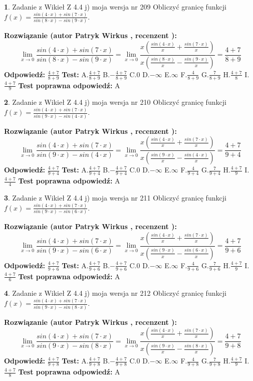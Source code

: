 \documentclass[12pt, a4paper]{article}
\theoremstyle{definition} %
\newtheorem{zad}{}
\newcommand{\zadStart}[1]{\begin{zad}#1\newline}
\newcommand{\zadStop}{\end{zad}}
\newcommand{\rozwStart}[2]{\noindent \textbf{Rozwiązanie (autor #1 , recenzent #2): }\newline}
\newcommand{\rozwStop}{\newline}
\newcommand{\odpStart}{\noindent \textbf{Odpowiedź:}\newline}
\newcommand{\odpStop}{\newline}
\newcommand{\testStart}{\noindent \textbf{Test:}\newline}
\newcommand{\testStop}{\newline}
\newcommand{\kluczStart}{\noindent \textbf{Test poprawna odpowiedź:}\newline}
\newcommand{\kluczStop}{\newline}
\begin{document}
\zadStart{Zadanie z Wikieł Z 4.4 j) moja wersja nr 209}
Obliczyć granicę funkcji $f(x)=\frac{sin(4\cdot x) +sin(7\cdot x)}{sin(8\cdot x) -sin(9\cdot x)}$.
\zadStop
\rozwStart{Patryk Wirkus}{}
$$\lim\limits_{x\to 0}\frac{sin(4\cdot x) +sin(7\cdot x)}{sin(8\cdot x) -sin(9\cdot x)}=\lim\limits_{x\to 0}\frac{x(\frac{sin(4\cdot x)}{x}+\frac{sin(7\cdot x)}{x})}{x(\frac{sin(8\cdot x)}{x}-\frac{sin(9\cdot x)}{x})}=\frac{4+7}{8+9}$$
\rozwStop
\odpStart
$\frac{4+7}{8+9}$
\odpStop
\testStart
A.$\frac{4+7}{8+9}$
B.$-\frac{4+7}{8+9}$
C.$0$
D.$-\infty$
E.$\infty$
F.$\frac{4}{8+9}$
G.$\frac{7}{8+9}$
H.$\frac{4+7}{8}$
I.$\frac{4+7}{9}$
\testStop
\kluczStart
A
\kluczStop



\zadStart{Zadanie z Wikieł Z 4.4 j) moja wersja nr 210}
Obliczyć granicę funkcji $f(x)=\frac{sin(4\cdot x) +sin(7\cdot x)}{sin(9\cdot x) -sin(4\cdot x)}$.
\zadStop
\rozwStart{Patryk Wirkus}{}
$$\lim\limits_{x\to 0}\frac{sin(4\cdot x) +sin(7\cdot x)}{sin(9\cdot x) -sin(4\cdot x)}=\lim\limits_{x\to 0}\frac{x(\frac{sin(4\cdot x)}{x}+\frac{sin(7\cdot x)}{x})}{x(\frac{sin(9\cdot x)}{x}-\frac{sin(4\cdot x)}{x})}=\frac{4+7}{9+4}$$
\rozwStop
\odpStart
$\frac{4+7}{9+4}$
\odpStop
\testStart
A.$\frac{4+7}{9+4}$
B.$-\frac{4+7}{9+4}$
C.$0$
D.$-\infty$
E.$\infty$
F.$\frac{4}{9+4}$
G.$\frac{7}{9+4}$
H.$\frac{4+7}{9}$
I.$\frac{4+7}{4}$
\testStop
\kluczStart
A
\kluczStop



\zadStart{Zadanie z Wikieł Z 4.4 j) moja wersja nr 211}
Obliczyć granicę funkcji $f(x)=\frac{sin(4\cdot x) +sin(7\cdot x)}{sin(9\cdot x) -sin(6\cdot x)}$.
\zadStop
\rozwStart{Patryk Wirkus}{}
$$\lim\limits_{x\to 0}\frac{sin(4\cdot x) +sin(7\cdot x)}{sin(9\cdot x) -sin(6\cdot x)}=\lim\limits_{x\to 0}\frac{x(\frac{sin(4\cdot x)}{x}+\frac{sin(7\cdot x)}{x})}{x(\frac{sin(9\cdot x)}{x}-\frac{sin(6\cdot x)}{x})}=\frac{4+7}{9+6}$$
\rozwStop
\odpStart
$\frac{4+7}{9+6}$
\odpStop
\testStart
A.$\frac{4+7}{9+6}$
B.$-\frac{4+7}{9+6}$
C.$0$
D.$-\infty$
E.$\infty$
F.$\frac{4}{9+6}$
G.$\frac{7}{9+6}$
H.$\frac{4+7}{9}$
I.$\frac{4+7}{6}$
\testStop
\kluczStart
A
\kluczStop



\zadStart{Zadanie z Wikieł Z 4.4 j) moja wersja nr 212}
Obliczyć granicę funkcji $f(x)=\frac{sin(4\cdot x) +sin(7\cdot x)}{sin(9\cdot x) -sin(8\cdot x)}$.
\zadStop
\rozwStart{Patryk Wirkus}{}
$$\lim\limits_{x\to 0}\frac{sin(4\cdot x) +sin(7\cdot x)}{sin(9\cdot x) -sin(8\cdot x)}=\lim\limits_{x\to 0}\frac{x(\frac{sin(4\cdot x)}{x}+\frac{sin(7\cdot x)}{x})}{x(\frac{sin(9\cdot x)}{x}-\frac{sin(8\cdot x)}{x})}=\frac{4+7}{9+8}$$
\rozwStop
\odpStart
$\frac{4+7}{9+8}$
\odpStop
\testStart
A.$\frac{4+7}{9+8}$
B.$-\frac{4+7}{9+8}$
C.$0$
D.$-\infty$
E.$\infty$
F.$\frac{4}{9+8}$
G.$\frac{7}{9+8}$
H.$\frac{4+7}{9}$
I.$\frac{4+7}{8}$
\testStop
\kluczStart
A
\kluczStop
\end{document}
